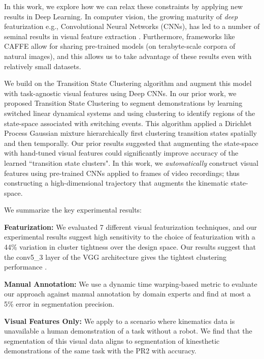\documentclass[0-main.tex]{subfiles}
\begin{document}
In this work, we explore how we can relax these constraints by applying new results in Deep Learning.
In computer vision, the growing maturity of \emph{deep} featurization e.g., Convolutional Neural Networks (CNNs), has led to a number of seminal results in visual feature extraction \cite{krizhevsky2012imagenet, lecun1995convolutional, jia2014caffe, long2014fully}.
Furthermore, frameworks like CAFFE \cite{jia2014caffe} allow for sharing pre-trained models (on terabyte-scale corpora of natural images), and this allows us to take advantage of these results even with relatively small datasets.

We build on the Transition State Clustering algorithm \cite{krishnan2015tsc} and augment this model with task-agnostic visual features using Deep CNNs.
In our prior work, we proposed Transition State Clustering to segment demonstrations by learning switched linear dynamical systems and using clustering to identify regions of the state-space associated with switching events.
This algorithm applied a Dirichlet Process Gaussian mixture hierarchically first clustering transition states spatially and then temporally.
Our prior results suggested that augmenting the state-space with hand-tuned visual features could significantly improve accuracy of the learned ``transition state clusters".
In this work, we \emph{automatically} construct visual features using pre-trained CNNs applied to frames of video recordings; thus constructing a high-dimensional trajectory that augments the kinematic state-space.

\noindent We summarize the key experimental results:

\noindent\textbf{Featurization: } We evaluated 7 different visual featurization techniques, and our experimental results suggest high sensitivity to the choice of featurization with a 44\% variation in cluster tightness over the design space. Our results suggest that the conv5\_3 layer of the VGG architecture gives the tightest clustering performance \cite{simonyan2014very}.

\vspace{0.25em}
\noindent\textbf{Manual Annotation: } We use a dynamic time warping-based metric to evaluate our approach against manual annotation by domain experts and find at most a 5\% error in segmentation precision.

\vspace{0.25em}
\noindent\textbf{Visual Features Only: } We apply \tsc to a scenario where kinematics data is unavailable a human demonstration of a task without a robot. We find that the segmentation of this visual data aligns to segmentation of kinesthetic demonstrations of the same task with the PR2 with  accuracy.  
\end{document}
